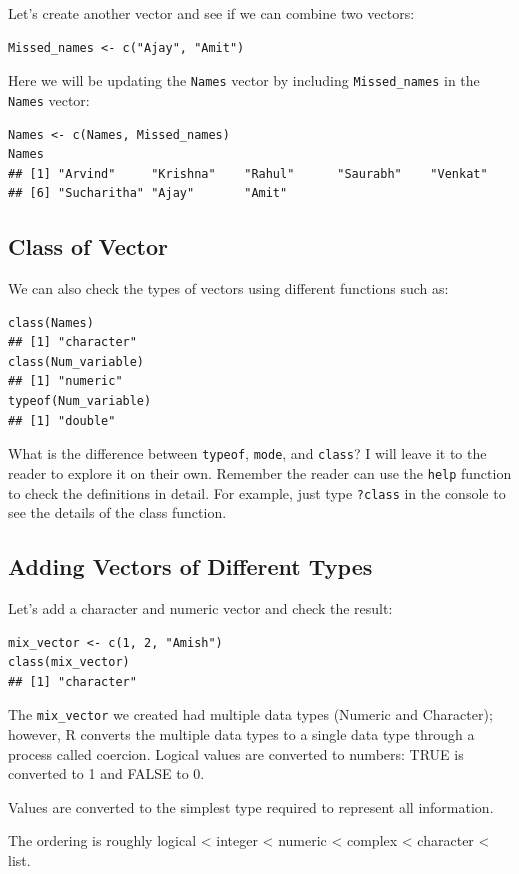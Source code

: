 \documentclass[12pt]{book}
\begin{document}
Let’s create another vector and see if we can combine two vectors:
\begin{verbatim}
Missed_names <- c("Ajay", "Amit")
\end{verbatim}

Here we will be updating the \texttt{Names} vector by including \texttt{Missed\_names} in the \texttt{Names} vector:
\begin{verbatim}
Names <- c(Names, Missed_names)
Names
## [1] "Arvind"     "Krishna"    "Rahul"      "Saurabh"    "Venkat"    
## [6] "Sucharitha" "Ajay"       "Amit"
\end{verbatim}

\subsection{Class of Vector}
We can also check the types of vectors using different functions such as:
\begin{verbatim}
class(Names)
## [1] "character"
class(Num_variable)
## [1] "numeric"
typeof(Num_variable)
## [1] "double"
\end{verbatim}

What is the difference between \texttt{typeof}, \texttt{mode}, and \texttt{class}? I will leave it to the reader to explore it on their own. Remember the reader can use the \texttt{help} function to check the definitions in detail. For example, just type \texttt{?class} in the console to see the details of the class function.

\subsection{Adding Vectors of Different Types}
Let’s add a character and numeric vector and check the result:
\begin{verbatim}
mix_vector <- c(1, 2, "Amish")
class(mix_vector)
## [1] "character"
\end{verbatim}

The \texttt{mix\_vector} we created had multiple data types (Numeric and Character); however, R converts the multiple data types to a single data type through a process called coercion. Logical values are converted to numbers: TRUE is converted to 1 and FALSE to 0.

Values are converted to the simplest type required to represent all information.

The ordering is roughly logical < integer < numeric < complex < character < list.
\end{document}
